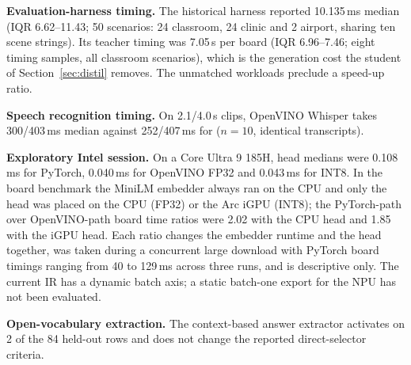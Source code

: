 \textbf{Evaluation-harness timing.} The historical harness reported 10.135\,ms median (IQR 6.62--11.43; 50 scenarios: 24 classroom, 24 clinic and 2 airport, sharing ten scene strings). Its teacher timing was 7.05\,s per board (IQR 6.96--7.46; eight timing samples, all classroom scenarios), which is the generation cost the student of Section~\ref{sec:distil} removes. The unmatched workloads preclude a speed-up ratio. %

\textbf{Speech recognition timing.} On 2.1/4.0\,s clips, OpenVINO Whisper takes 300/403\,ms median against 252/407\,ms for  ($n=10$, identical transcripts).

\textbf{Exploratory Intel session.} On a Core Ultra 9 185H, head medians were 0.108\,ms for PyTorch, 0.040\,ms for OpenVINO FP32 and 0.043\,ms for INT8. In the board benchmark the MiniLM embedder always ran on the CPU and only the head was placed on the CPU (FP32) or the Arc iGPU (INT8); the PyTorch-path over OpenVINO-path board time ratios were 2.02 with the CPU head and 1.85 with the iGPU head. Each ratio changes the embedder runtime and the head together, was taken during a concurrent large download with PyTorch board timings ranging from 40 to 129\,ms across three runs, and is descriptive only. The current IR has a dynamic batch axis; a static batch-one export for the NPU has not been evaluated.

\textbf{Open-vocabulary extraction.} The context-based answer extractor activates on 2 of the 84 held-out rows and does not change the reported direct-selector criteria. %

